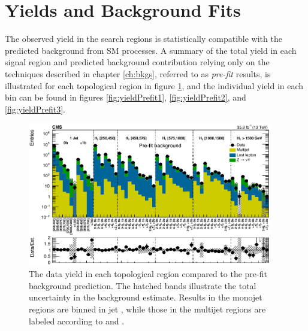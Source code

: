 \section{Yields and Background Fits}
\label{sec:yields}

The observed yield in the search regions is statistically compatible with the predicted background from SM processes. A summary of the total yield in each signal region and predicted background contribution relying only on the techniques described in chapter \ref{ch:bkgs}, referred to as {\it pre-fit} results, is illustrated for each topological region in figure \ref{fig:yieldPrefitTopological}, and the individual yield in each \mttwo bin can be found in figures \ref{fig:yieldPrefit1}, \ref{fig:yieldPrefit2}, and \ref{fig:yieldPrefit3}.
\begin{figure}
	\centering
	\includegraphics[width=0.95\textwidth]{results/figs/mt2_ALL_fullEstimate}
	\renewcommand{\baselinestretch}{1.0}
	\caption[The data yield in each topological region compared to the pre-fit background prediction.]{The data yield in each topological region compared to the pre-fit background prediction. The hatched bands illustrate the total uncertainty in the background estimate. Results in the monojet regions are binned in jet \pt, while those in the multijet regions are labeled according to \nj and \nb.}
	\label{fig:yieldPrefitTopological}
\end{figure}
